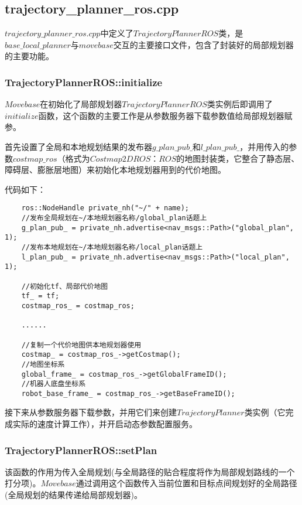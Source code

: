 \documentclass[9pt, oneside]{book}
\begin{document}
\subsection{trajectory\_planner\_ros.cpp}

$trajectory\_planner\_ros.cpp$中定义了$TrajectoryPlannerROS$类，是$base\_local\_planner$与$movebase$交互的主要接口文件，包含了封装好的局部规划器的主要功能。


\subsubsection{TrajectoryPlannerROS::initialize}

$Movebase$在初始化了局部规划器$TrajectoryPlannerROS$类实例后即调用了$initialize$函数，这个函数的主要工作是从参数服务器下载参数值给局部规划器赋参。

首先设置了全局和本地规划结果的发布器$g\_plan\_pub\_$和$l\_plan\_pub\_$，并用传入的参数$costmap\_ros$（格式为$Costmap2DROS：ROS$的地图封装类，它整合了静态层、障碍层、膨胀层地图）来初始化本地规划器用到的代价地图。

代码如下：

\small
\begin{verbatim}
    ros::NodeHandle private_nh("~/" + name);
    //发布全局规划在~/本地规划器名称/global_plan话题上
    g_plan_pub_ = private_nh.advertise<nav_msgs::Path>("global_plan", 1);
    //发布本地规划在~/本地规划器名称/local_plan话题上
    l_plan_pub_ = private_nh.advertise<nav_msgs::Path>("local_plan", 1);

    //初始化tf、局部代价地图
    tf_ = tf;
    costmap_ros_ = costmap_ros;

    ......
    
    //复制一个代价地图供本地规划器使用
    costmap_ = costmap_ros_->getCostmap();
    //地图坐标系
    global_frame_ = costmap_ros_->getGlobalFrameID();
    //机器人底盘坐标系
    robot_base_frame_ = costmap_ros_->getBaseFrameID();
\end{verbatim}
\normalsize

接下来从参数服务器下载参数，并用它们来创建$TrajectoryPlanner$类实例（它完成实际的速度计算工作），并开启动态参数配置服务。

\subsubsection{TrajectoryPlannerROS::setPlan}

该函数的作用为传入全局规划(与全局路径的贴合程度将作为局部规划路线的一个打分项)。$Movebase$通过调用这个函数传入当前位置和目标点间规划好的全局路径(全局规划的结果传递给局部规划器)。
\end{document}
